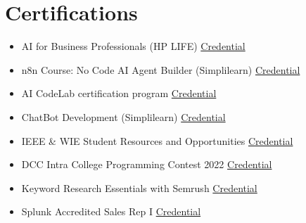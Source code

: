 \documentclass[a4paper,10pt]{article}
\begin{document}
\section*{Certifications}
\begin{itemize}[noitemsep]
    \item AI for Business Professionals (HP LIFE)\hfill
    \href{https://www.life-global.org/certificate/fd904588-8a5e-4868-ae08-fcf380a5cf76}{Credential} 
    \item n8n Course: No Code AI Agent Builder (Simplilearn)\hfill
    \href{https://www.simplilearn.com/skillup-certificate-landing?token=eyJjb3Vyc2VfaWQiOiI0OTUxIiwiY2VydGlmaWNhdGVfdXJsIjoiaHR0cHM6XC9cL2NlcnRpZmljYXRlcy5zaW1wbGljZG4ubmV0XC9zaGFyZVwvOTM4NzkwNF85Njk2MDQ3MTc2Mjk4ODY3NzUyMy5wbmciLCJ1c2VybmFtZSI6Ik1EIE1BSEkgSEFNSUQgUkFUVUwifQ&utm_source=shared-certificate&utm_medium=app_lms&utm_campaign=shared-certificate-promotion&referrer=https%3A%2F%2Fcertificates.simplicdn.net%2Fshare%2F9387904_96960471762988677523.png&_branch_match_id=1480855433471944621&_branch_referrer=H4sIAAAAAAAAA8soKSkottLXL87MLcjJ1EssKNDLyczL1veOSkkONo7MS4tMsq8rSk1LLSrKzEuPTyrKLy9OLbL1AapJTfHMAwDijjBMPwAAAA%3D%3D}{Credential} 
    \item AI CodeLab certification program\hfill
    \href{https://aicodelab.learnwithsumit.com/certificate/md-mahi-hamid-ratul-1009-lws-aicodelab}{Credential} 
    \item ChatBot Development (Simplilearn)\hfill
    \href{https://www.simplilearn.com/skillup-certificate-landing?token=eyJjb3Vyc2VfaWQiOiI1NjQxIiwiY2VydGlmaWNhdGVfdXJsIjoiaHR0cHM6XC9cL2NlcnRpZmljYXRlcy5zaW1wbGljZG4ubmV0XC9zaGFyZVwvOTM4NzcwN185NjcxMjM0MTc2Mjk4MDk2MjYwMS5wbmciLCJ1c2VybmFtZSI6IlJBVFVMIn0&utm_source=shared-certificate&utm_medium=app_lms&utm_campaign=shared-certificate-promotion&referrer=https%3A%2F%2Fcertificates.simplicdn.net%2Fshare%2F9387707_96712341762980962601.png&_branch_match_id=1480855433471944621&_branch_referrer=H4sIAAAAAAAAA8soKSkottLXL87MLcjJ1EssKNDLyczL1k908ncyL8m3zIhMsq8rSk1LLSrKzEuPTyrKLy9OLbL1AapJTfHMAwC4Kh9%2FPwAAAA%3D%3D}{Credential} 
    \item IEEE \& WIE Student Resources and Opportunities\hfill
    \href{#}{Credential} 
    \item DCC Intra College Programming Contest 2022\hfill
    \href{#}{Credential} 
    \item Keyword Research Essentials with Semrush\hfill
    \href{https://static.semrush.com/academy/certificates/42d7270180/md-mahi-hamid-ratul_25.pdf}{Credential} 
    \item Splunk Accredited Sales Rep I\hfill
    \href{https://static.semrush.com/academy/certificates/42d7270180/md-mahi-hamid-ratul_25.pdf}{Credential} 
\end{itemize}
\end{document}
